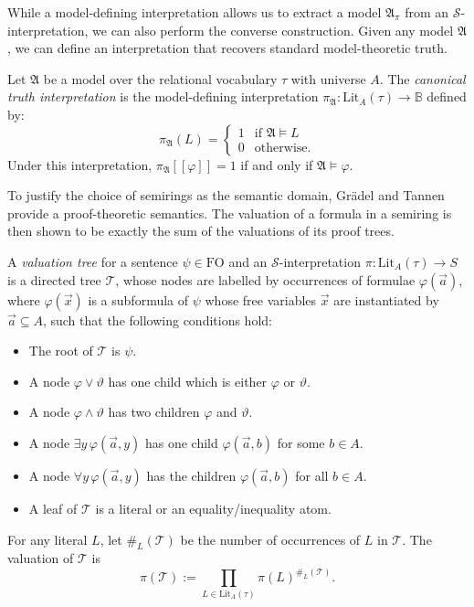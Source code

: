 \documentclass[oneside, 11pt]{amsbook}
\theoremstyle{plain}
\theoremstyle{definition}
\theoremstyle{remark}
\begin{document}
While a model-defining interpretation allows us to extract a model $\mathfrak{A}_\pi$ from an $\mathcal{S}$-interpretation, we can also perform the converse construction. Given any model $\mathfrak{A}$, we can define an interpretation that recovers standard model-theoretic truth.

\begin{exmpl}
    Let $\mathfrak{A}$ be a model over the relational vocabulary $\tau$ with universe $A$. The \emph{canonical truth interpretation} is the model-defining interpretation $\pi_{\mathfrak{A}} : \text{Lit}_A(\tau) \to \mathbb{B}$ defined by:
    \[
        \pi_{\mathfrak{A}}(L) =
        \begin{cases}
            1 & \text{if } \mathfrak{A} \models L \\
            0 & \text{otherwise.}
        \end{cases}
    \]
    Under this interpretation, $\pi_{\mathfrak{A}} [\![ \varphi ]\!] = 1$ if and only if $\mathfrak{A} \models \varphi$.
\end{exmpl}

To justify the choice of semirings as the semantic domain, Grädel and Tannen provide a proof-theoretic semantics. The valuation of a formula in a semiring is then shown to be exactly the sum of the valuations of its proof trees.

\begin{defn}
    A \emph{valuation tree} for a sentence $\psi \in \mathrm{FO}$ and an $\mathcal{S}$-interpretation $\pi : \mathrm{Lit}_A(\tau) \to S$ is a directed tree $\mathcal{T}$, whose nodes are labelled by occurrences of formulae $\varphi(\vec{a})$, where $\varphi(\vec{x})$ is a subformula of $\psi$ whose free variables $\vec{x}$ are instantiated by $\vec{a} \subseteq A$, such that the following conditions hold:
    \begin{itemize}
        \item The root of $\mathcal{T}$ is $\psi$.
        \item A node $\varphi \lor \vartheta$ has one child which is either $\varphi$ or
              $\vartheta$.
        \item A node $\varphi \land \vartheta$ has two children $\varphi$ and $\vartheta$.
        \item A node $\exists y\, \varphi(\vec{a}, y)$ has one child $\varphi(\vec{a}, b)$
              for some $b \in A$.
        \item A node $\forall y\, \varphi(\vec{a}, y)$ has the children
              $\varphi(\vec{a}, b)$ for all $b \in A$.
        \item A leaf of $\mathcal{T}$ is a literal or an equality/inequality atom.
    \end{itemize}

    For any literal $L$, let $\#_L(\mathcal{T})$ be the number of occurrences of $L$ in $\mathcal{T}$. The valuation of $\mathcal{T}$ is
    \[
        \pi(\mathcal{T}) := \prod_{L \in \mathrm{Lit}_A(\tau)} \pi(L)^{\#_L(\mathcal{T})}.
    \]
\end{defn}
\end{document}
